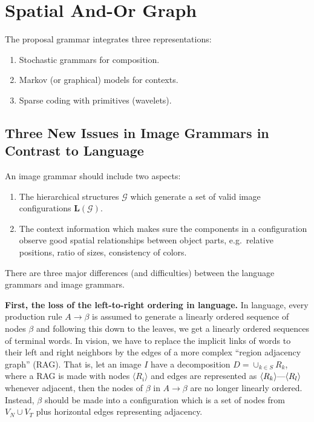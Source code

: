 \documentclass[../Notes_of_CaRiVaC.tex]{subfiles}
\begin{document}
\chapter{Spatial And-Or Graph}%
\label{sec:ii.2}
The proposal grammar integrates three representations:
%
\begin{enumerate}
  \item Stochastic grammars for composition.
  \item Markov (or graphical) models for contexts.
  \item Sparse coding with primitives (wavelets).
\end{enumerate}
%

\section{Three New Issues in Image Grammars in Contrast to Language}%
\label{sec:ii.2.1}
An image grammar should include two aspects:
%
\begin{enumerate}
  \item The hierarchical structures $\mathcal{G}$ which generate a set of valid
    image configurations $\mathbf{L}(\mathcal{G})$.
  \item The context information which makes sure the components in a
    configuration observe good spatial relationships between object parts,
    e.g.\ relative positions, ratio of sizes, consistency of colors.
\end{enumerate}
%

There are three major differences (and difficulties) between the language
grammars and image grammars.

\textbf{First, the loss of the left-to-right ordering in language.} In
language, every production rule $A \to \beta$ is assumed to generate a linearly
ordered sequence of nodes $\beta$ and following this down to the leaves, we get
a linearly ordered sequences of terminal words. In vision, we have to replace
the implicit links of words to their left and right neighbors by the edges of a
more complex ``region adjacency graph'' (RAG). That is, let an image $I$ have a
decomposition $D = \cup_{k \in S} R_k$, where a RAG is made with nodes
$\langle R_i \rangle$ and edges are represented as
$\langle R_k \rangle \text{\textemdash} \langle R_l \rangle$ whenever adjacent,
then the nodes of $\beta$ in $A \to \beta$ are no longer linearly ordered.
Instead, $\beta$ should be made into a configuration which is a set of nodes
from $V_N \cup V_T$ plus horizontal edges representing adjacency.
\end{document}
